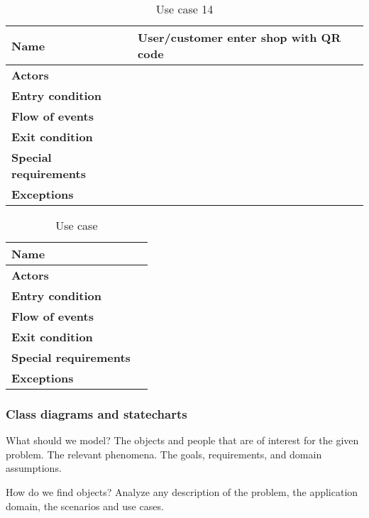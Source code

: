\begin{table}[h!]
    \centering
    \begin{tabular}{@{}P{0.2\textwidth}P{0.70\textwidth}@{}}
        \toprule
        \textbf{Name}                 & User/customer enter shop with QR code\\
        \midrule
        \textbf{Actors}               & \\
        \textbf{Entry condition}      & \\
        \textbf{Flow of events}       & \\
        \textbf{Exit condition}       & \\
        \textbf{Special requirements} & \\
        \textbf{Exceptions}           & \\
        \bottomrule
    \end{tabular}
\caption{Use case 14}
\label{table:usecase14}
\end{table}

\begin{table}[h!]
    \centering
    \begin{tabular}{@{}P{0.2\textwidth}P{0.70\textwidth}@{}}
        \toprule
        \textbf{Name}                 & \\
        \midrule
        \textbf{Actors}               & \\
        \textbf{Entry condition}      & \\
        \textbf{Flow of events}       & \\
        \textbf{Exit condition}       & \\
        \textbf{Special requirements} & \\
        \textbf{Exceptions}           & \\
        \bottomrule
    \end{tabular}
\caption{Use case }
\label{table:usecase}
\end{table}

\clearpage

\subsubsection{Class diagrams and statecharts}
\label{subsubsect:diagrams}

What should we model? The objects and people that are of interest for the given problem. The relevant phenomena. The goals, requirements, and domain assumptions.

How do we find objects? Analyze any description of the problem, the application domain, the scenarios and use cases. 

